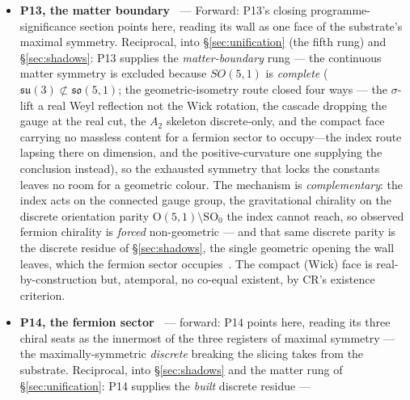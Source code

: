 \documentclass[11pt,a4paper]{article}
\theoremstyle{definition}
\begin{document}
\begin{itemize}
of $SO(5,1)/SO(4,1)$ (\texttt{prop:closure}, term for term), and the
structure function at the root of the problem of time
\emph{is} the substrate's coset metric, its base-dependence the
obstruction --- so the problem of time dissolves into a single geometric
fact of the maximal symmetry, established on the symmetry-reducible sector.
The orientation-parity $\mathbb{Z}_2$ of \S\ref{sec:shadows} is realised here
as the central inversion / double-ruling swap, and the su(3) exclusion carried with
its own scope ($SU(3)\not\subset SO(5)$; the $A_2$ the discrete
Weyl shadow only, no continuous colour isometry).
\item \textbf{P13, the matter boundary~\cite{JanzenBoundary}} --- Forward: P13's closing programme-significance section points here, reading its wall as
one face of the substrate's maximal symmetry. Reciprocal, into
\S\ref{sec:unification} (the fifth rung) and \S\ref{sec:shadows}: P13
supplies the \emph{matter-boundary} rung --- the continuous matter symmetry
is excluded because $SO(5,1)$ is \emph{complete} ($\mathfrak{su}(3)\not\subset
\mathfrak{so}(5,1)$; the geometric-isometry route closed four ways --- the
$\sigma$-lift a real Weyl reflection not the Wick rotation, the cascade
dropping the gauge at the real cut, the $A_2$ skeleton discrete-only, and the
compact face carrying no massless content for a fermion sector to occupy---the
index route lapsing there on dimension, and the positive-curvature one
supplying the conclusion instead), so the exhausted symmetry that locks the constants leaves no
room for a geometric colour. The mechanism is \emph{complementary}: the index
acts on the connected gauge group, the gravitational chirality on the
discrete orientation parity $\mathrm{O}(5,1)\setminus\mathrm{SO}_0$ the index
cannot reach, so observed fermion chirality is \emph{forced} non-geometric
--- and that same discrete parity is the discrete residue of
\S\ref{sec:shadows}, the single geometric opening the wall leaves, which the fermion sector
occupies~\cite{JanzenMatter}. The compact (Wick) face is
real-by-construction but, atemporal, no co-equal existent, by CR's
existence criterion.
\item \textbf{P14, the fermion sector~\cite{JanzenMatter}} --- forward: P14 points here, reading its three chiral
seats as the innermost of the three registers of maximal symmetry ---
the maximally-symmetric \emph{discrete} breaking the slicing takes from the
substrate. Reciprocal, into \S\ref{sec:shadows} and the matter rung of
\S\ref{sec:unification}: P14 supplies the \emph{built} discrete residue ---

\end{itemize}
\end{document}
